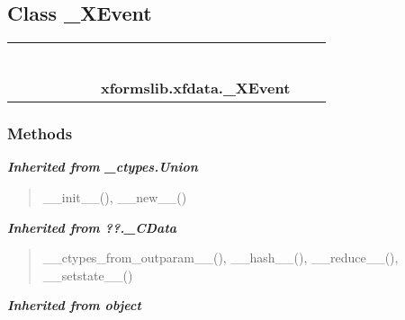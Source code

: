 \subsection{Class \_XEvent}

    \label{xformslib:xfdata:_XEvent}
\begin{tabular}{cccccccccc}
\multicolumn{2}{r}{\settowidth{\BCL}{object}\multirow{2}{\BCL}{object}}
&&
&&
&&
  \\\cline{3-3}
  &&\multicolumn{1}{c|}{}
&&
&&
&&
  \\
\multicolumn{4}{r}{\settowidth{\BCL}{??.\_CData}\multirow{2}{\BCL}{??.\_CData}}
&&
&&
  \\\cline{5-5}
  &&&&\multicolumn{1}{c|}{}
&&
&&
  \\
\multicolumn{6}{r}{\settowidth{\BCL}{\_ctypes.Union}\multirow{2}{\BCL}{\_ctypes.Union}}
&&
  \\\cline{7-7}
  &&&&&&\multicolumn{1}{c|}{}
&&
  \\
&&&&&&\multicolumn{2}{l}{\textbf{xformslib.xfdata.\_XEvent}}
\end{tabular}



  \subsubsection{Methods}


\large{\textbf{\textit{Inherited from \_ctypes.Union}}}

\begin{quote}
\_\_init\_\_(), \_\_new\_\_()
\end{quote}

\large{\textbf{\textit{Inherited from ??.\_CData}}}

\begin{quote}
\_\_ctypes\_from\_outparam\_\_(), \_\_hash\_\_(), \_\_reduce\_\_(), \_\_setstate\_\_()
\end{quote}

\large{\textbf{\textit{Inherited from object}}}

